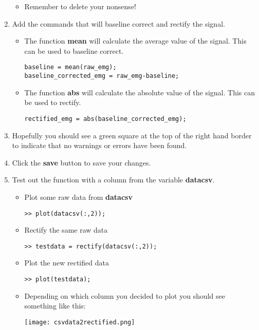 \documentclass[12pt,a4paper]{article}
\begin{document}
\begin{enumerate}
\begin{itemize}
		\item Remember to delete your nonsense!
	\end{itemize}
	\item Add the commands that will baseline correct and rectify the signal.
	\begin{itemize}
		\item The function \textbf{mean} will calculate the average value of the signal.  This can be used to baseline correct.
		\begin{lstlisting}[style=Matlab-editor]
baseline = mean(raw_emg);
baseline_corrected_emg = raw_emg-baseline;
		\end{lstlisting}
		\item The function \textbf{abs} will calculate the absolute value of the signal.  This can be used to rectify.
		\begin{lstlisting}[style=Matlab-editor]
rectified_emg = abs(baseline_corrected_emg);
		\end{lstlisting}			
	\end{itemize}
	\item Hopefully you should see a green square at the top of the right hand border to indicate that no warnings or errors have been found.	
	\item Click the \textbf{save} button to save your changes.
	\item Test out the function with a column from the variable \textbf{datacsv}.
	\begin{itemize}
		\item Plot some raw data from \textbf{datacsv}
		\begin{lstlisting}[style=Matlab-editor]
>> plot(datacsv(:,2));
		\end{lstlisting}
		\item Rectify the same raw data
		\begin{lstlisting}[style=Matlab-editor]
>> testdata = rectify(datacsv(:,2));
		\end{lstlisting}	
		\item Plot the new rectified data
		\begin{lstlisting}[style=Matlab-editor]
>> plot(testdata);
		\end{lstlisting}	
		\item Depending on which column you decided to plot you should see something like this:
		\begin{center}
			\texttt{[image: csvdata2rectified.png]}
		\end{center}
	\end{itemize}	
\end{enumerate}
\end{document}
